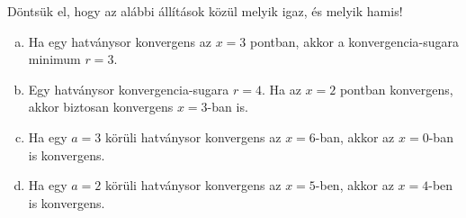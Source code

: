 \documentclass[exercise]{math-standalone}
\begin{document}
\begin{exercise}{%
    Döntsük el, hogy az alábbi állítások közül melyik igaz, és melyik hamis!
  }
  \begin{enumerate}[a)]
    \item Ha egy hatványsor konvergens az $x = 3$ pontban, akkor a
          konvergencia-sugara minimum $r = 3$.

    \item Egy hatványsor konvergencia-sugara $r = 4$. Ha az $x = 2$ pontban
          konvergens, akkor biztosan konvergens $x = 3$-ban is.

    \item Ha egy $a = 3$ körüli hatványsor konvergens az $x = 6$-ban, akkor
          az $x = 0$-ban is konvergens.

    \item Ha egy $a = 2$ körüli hatványsor konvergens az $x = 5$-ben, akkor
          az $x = 4$-ben is konvergens.
  \end{enumerate}

\end{exercise}
\end{document}
